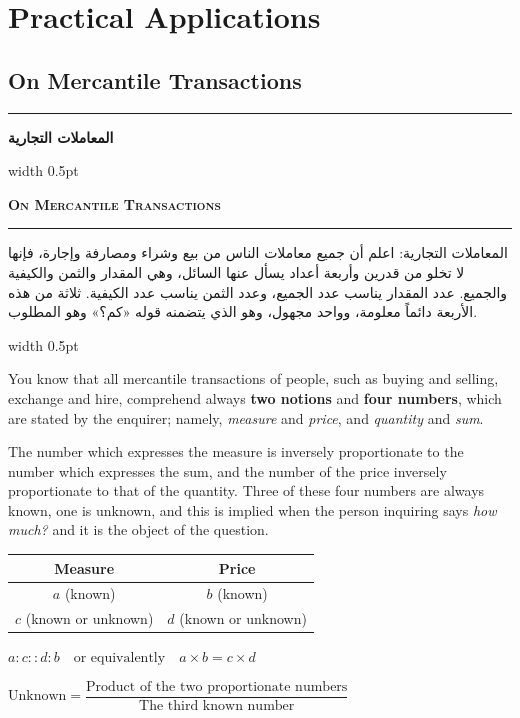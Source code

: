 \documentclass[10pt,a4paper]{book}
\newlength{\colwidth}
\newcommand{\bilingualpair}[2]{%
  \noindent
  \begin{minipage}[t]{\colwidth}
  \begin{flushright}
  \vspace{0pt}
  {\arabicfont\small #1}
  \end{flushright}
  \end{minipage}%
  \hfill\textcolor{columnsepclr}{\vrule width 0.5pt}\hfill
  \begin{minipage}[t]{\colwidth}
  \vspace{0pt}
  {\small #2}
  \end{minipage}%
  \par\vspace{0.6em}
}
\newcommand{\bilingualsectionheader}[2]{%
  \par\vspace{0.8em}
  \noindent
  \begin{minipage}[t]{\colwidth}
  \begin{flushright}
  \textbf{\arabicfont #1}
  \end{flushright}
  \end{minipage}%
  \hfill\textcolor{columnsepclr}{\vrule width 0.5pt}\hfill
  \begin{minipage}[t]{\colwidth}
  \textbf{\textsc{#2}}
  \end{minipage}%
  \par\vspace{0.5em}
}
\begin{document}
\part{Practical Applications}
\label{part:practical}

\chapter{On Mercantile Transactions}
\label{ch:mercantile}

\noindent\textcolor{columnsepclr}{\rule{\textwidth}{0.6pt}}\par\vspace{0.3em}
\bilingualsectionheader{المعاملات التجارية}{On Mercantile Transactions}
\noindent\textcolor{columnsepclr}{\rule{\textwidth}{0.6pt}}\par\vspace{0.5em}

\bilingualpair{
المعاملات التجارية: اعلم أن جميع معاملات الناس من بيع وشراء
ومصارفة وإجارة، فإنها لا تخلو من قدرين وأربعة أعداد يسأل
عنها السائل، وهي المقدار والثمن والكيفية والجميع. عدد المقدار
يناسب عدد الجميع، وعدد الثمن يناسب عدد الكيفية. ثلاثة من هذه
الأربعة دائماً معلومة، وواحد مجهول، وهو الذي يتضمنه قوله «كم؟»
وهو المطلوب.
}{
You know that all mercantile transactions of people, such as buying and
selling, exchange and hire, comprehend always \textbf{two notions} and
\textbf{four numbers}, which are stated by the enquirer; namely,
\textit{measure} and \textit{price}, and \textit{quantity} and \textit{sum}.

The number which expresses the measure is inversely proportionate to the
number which expresses the sum, and the number of the price inversely
proportionate to that of the quantity. Three of these four numbers are
always known, one is unknown, and this is implied when the person inquiring
says \textit{how much?} and it is the object of the question.
}

\vspace{0.5em}
\begin{mathbox}[title={\textbf{The Rule of Four Numbers}}]
\begin{center}
\begin{tabular}{c|c}
\textbf{Measure} & \textbf{Price} \\
\hline
$a$ (known) & $b$ (known) \\
$c$ (known or unknown) & $d$ (known or unknown) \\
\end{tabular}

\vspace{0.3cm}

$a : c :: d : b \quad\text{or equivalently}\quad a \times b = c \times d$

$\text{Unknown} = \dfrac{\text{Product of the two proportionate numbers}}{\text{The third known number}}$
\end{center}
\end{mathbox}
\vspace{0.5em}
\end{document}
